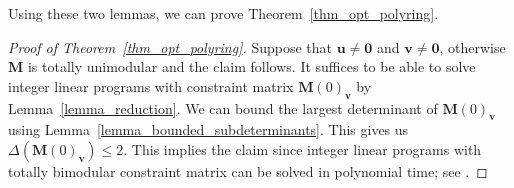 \documentclass[a4paper, 11pt]{article}
\newcommand{\Z}{\mathbb{Z}}
\newcommand{\bv}{\bm{v}}
\newcommand{\bu}{\bm{u}}
\newcommand{\bM}{\bm{M}}
\newcommand{\indet}{x}
\newcommand{\intvar}{a}
\newcommand{\polyring}{\Z[\indet]}
\newcommand{\polyS}{S}
\newcommand{\polyM}{\bM}
\newtheorem{lemma}{Lemma}
\begin{document}
	Using these two lemmas, we can prove Theorem~\ref{thm_opt_polyring}.
	
	
	
	\begin{proof}[Proof of Theorem~\ref{thm_opt_polyring}]
		Suppose that $\bu\neq \bm{0}$ and $\bv\neq \bm{0}$, otherwise $\polyM$ is totally unimodular and the claim follows. It suffices to be able to solve integer linear programs with constraint matrix $\bM(0)_{\bv}$ by Lemma~\ref{lemma_reduction}. We can bound the largest determinant of $\bM(0)_{\bv}$ using Lemma~\ref{lemma_bounded_subdeterminants}. %
		This gives us $\Delta\left(\bM(0)_{\bv}\right)\leq 2$. This implies the claim since integer linear programs with totally bimodular constraint matrix can be solved in polynomial time; see \cite{artweiszenbimodalgo2017}.
	\end{proof}
	
	
\end{document}
